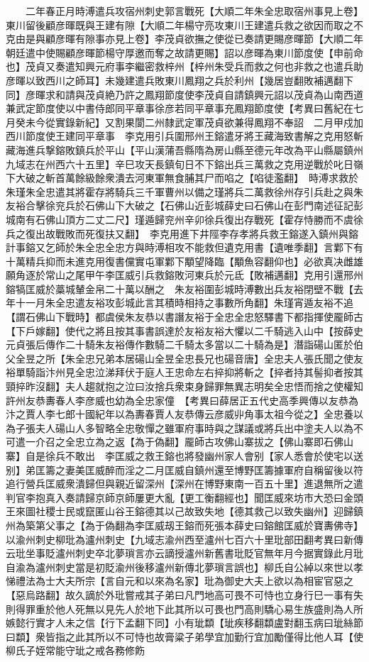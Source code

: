 　　二年春正月時溥遣兵攻宿州刺史郭言戰死【大順二年朱全忠取宿州事見上卷】　東川留後顧彦暉既與王建有隙【大順二年楊守亮攻東川王建遣兵救之欲因而取之不克由是與顧彦暉有隙事亦見上卷】李茂貞欲撫之使從已奏請更賜彦暉節【大順二年朝廷遣中使賜顧彦暉節楊守厚邀而奪之故請更賜】詔以彦暉為東川節度使【申前命也】茂貞又奏遣知興元府事李繼密救梓州【梓州朱受兵而救之何也非救之也遣兵助彦暉以致西川之師耳】未幾建遣兵敗東川鳳翔之兵於利州【幾居豈翻敗補邁翻下同】彦暉求和請與茂貞絶乃許之鳳翔節度使李茂貞自請鎮興元詔以茂貞為山南西道兼武定節度使以中書侍郎同平章事徐彦若同平章事充鳳翔節度使【考異曰舊紀在七月癸未今從實錄新紀】又割果閬二州隸武定軍茂貞欲兼得鳳翔不奉詔　二月甲戍加西川節度使王建同平章事　李克用引兵圍邢州王鎔遣牙將王藏海致書解之克用怒斬藏海進兵撃鎔敗鎮兵於平山【平山漢蒲吾縣隋為房山縣至德元年改為平山縣屬鎮州九域志在州西六十五里】辛巳攻天長鎮旬日不下鎔出兵三萬救之克用逆戰於叱日嶺下大破之斬首萬餘級餘衆潰去河東軍無食脯其尸而啗之【啗徒濫翻】　時溥求救於朱瑾朱全忠遣其將霍存將騎兵三千軍曹州以備之瑾將兵二萬救徐州存引兵赴之與朱友裕合擊徐兖兵於石佛山下大破之【石佛山近彭城薛史曰石佛山在彭門南述征記彭城南有石佛山頂方二丈二尺】瑾遁歸兖州辛卯徐兵復出存戰死【霍存恃勝而不虞徐兵之復出故戰敗而死復扶又翻】　李克用進下井陘李存孝將兵救王鎔遂入鎮州與鎔計事鎔又乞師於朱全忠全忠方與時溥相攻不能救但遺克用書【遺唯季翻】言鄴下有十萬精兵抑而未進克用復書儻實屯軍鄴下顒望降臨【顒魚容翻仰也】必欲真决雌雄願角逐於常山之尾甲午李匡威引兵救鎔敗河東兵於元氐【敗補邁翻】克用引還邢州鎔犒匡威於藁城輦金帛二十萬以酬之　朱友裕圍彭城時溥數出兵友裕閉壁不戰【去年十一月朱全忠遣友裕攻彭城此言其積時相持之事數所角翻】朱瑾宵遁友裕不追【謂石佛山下戰時】都虞侯朱友恭以書譖友裕于全忠全忠怒驛書下都指揮使龎師古【下戶嫁翻】使代之將且按其事書誤達於友裕友裕大懼以二千騎逃入山中【按薛史元貞張后傳作二十騎朱友裕傳作數騎二千騎太多當以二十騎為是】潛詣碭山匿於伯父全昱之所【朱全忠兄弟本居碭山全昱全忠長兄也碭音唐】全忠夫人張氏聞之使友裕單騎詣汴州見全忠泣涕拜伏于庭人王忠命左右捽抑將斬之【捽者持其髻抑者按其頸捽昨沒翻】夫人趨就抱之泣曰汝捨兵衆束身歸罪無異志明矣全忠悟而捨之使權知許州友恭夀春人李彦威也幼為全忠家僮　【考異曰薛居正五代史高季興傳以友恭為汴之賈人李七郎十國紀年以為夀春賈人友恭傳云彦威丱角事太祖今從之】全忠養以為子張夫人碭山人多智略全忠敬憚之雖軍府事時與之謀議或將兵出中塗夫人以為不可遣一介召之全忠立為之返【為于偽翻】龎師古攻佛山寨拔之【佛山寨即石佛山寨】自是徐兵不敢出　李匡威之救王鎔也將發幽州家人會别【家人悉會於使宅以送别】弟匡籌之妻美匡威醉而淫之二月匡威自鎮州還至博野匡籌據軍府自稱留後以符追行營兵匡威衆潰歸但與親近留深州【深州在博野東南一百五十里】進退無所之遣判官李抱真入奏請歸京師京師屢更大亂【更工衡翻經也】聞匡威來坊市大恐曰金頭王來圖社稷士民或竄匿山谷王鎔德其以己故致失地【德其救己以致失幽州】迎歸鎮州為築第父事之【為于偽翻為李匡威刼王鎔而死張本薛史曰鎔館匡威於寶夀佛寺】　以渝州刺史柳玭為瀘州刺史【九域志渝州西至瀘州七百六十里玭部田翻考異曰新傳云玭坐事貶瀘州刺史卒北夢瑣言亦云謫授瀘州新舊書玭貶官無年月今据實錄此月玭自渝為瀘州刺史當是初貶渝州後移瀘州新傳北夢瑣言誤也】柳氏自公綽以來世以孝悌禮法為士大夫所宗【言自元和以來為名家】玭為御史大夫上欲以為相宦官惡之【惡烏路翻】故久謫於外玭嘗戒其子弟曰凡門地高可畏不可恃也立身行巳一事有失則得罪重於他人死無以見先人於地下此其所以可畏也門高則驕心易生族盛則為人所嫉懿行實才人未之信【行下孟翻下同】小有玼纇【玼疾移翻纇盧對翻玉病曰玼絲節曰纇】衆皆指之此其所以不可恃也故膏粱子弟學宜加勤行宜加勵僅得比他人耳【使柳氏子姪常能守玼之戒各務修飭